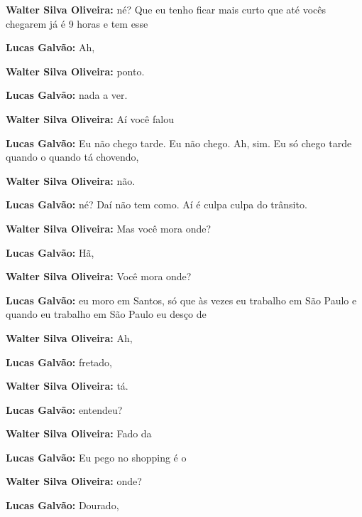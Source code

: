 \textbf{Walter Silva Oliveira:} né? Que eu tenho ficar mais curto que até vocês chegarem já é 9 horas e tem esse



\textbf{Lucas Galvão:} Ah,



\textbf{Walter Silva Oliveira:} ponto.



\textbf{Lucas Galvão:} nada a ver.



\textbf{Walter Silva Oliveira:} Aí você falou



\textbf{Lucas Galvão:} Eu não chego tarde. Eu não chego. Ah, sim. Eu só chego tarde quando o quando tá chovendo,



\textbf{Walter Silva Oliveira:} não.



\textbf{Lucas Galvão:} né? Daí não tem como. Aí é culpa culpa do trânsito.



\textbf{Walter Silva Oliveira:} Mas você mora onde?



\textbf{Lucas Galvão:} Hã,



\textbf{Walter Silva Oliveira:} Você mora onde?



\textbf{Lucas Galvão:} eu moro em Santos, só que às vezes eu trabalho em São Paulo e quando eu trabalho em São Paulo eu desço de



\textbf{Walter Silva Oliveira:} Ah,



\textbf{Lucas Galvão:} fretado,



\textbf{Walter Silva Oliveira:} tá.



\textbf{Lucas Galvão:} entendeu?



\textbf{Walter Silva Oliveira:} Fado da



\textbf{Lucas Galvão:} Eu pego no shopping é o



\textbf{Walter Silva Oliveira:} onde?



\textbf{Lucas Galvão:} Dourado,



